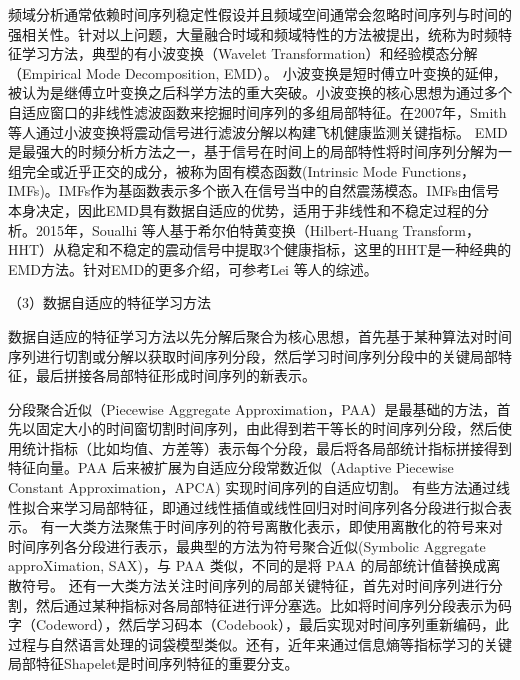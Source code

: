 频域分析通常依赖时间序列稳定性假设并且频域空间通常会忽略时间序列与时间的强相关性\cite{jardine2006review,lei2013review}。针对以上问题，大量融合时域和频域特性的方法被提出，统称为时频特征学习方法，典型的有小波变换（Wavelet Transformation）\cite{smith2007approach}和经验模态分解（Empirical Mode Decomposition, EMD）\cite{lei2013review}。
小波变换是短时傅立叶变换的延伸，被认为是继傅立叶变换之后科学方法的重大突破。小波变换的核心思想为通过多个自适应窗口的非线性滤波函数来挖掘时间序列的多组局部特征。在2007年，Smith 等人通过小波变换将震动信号进行滤波分解以构建飞机健康监测关键指标\cite{smith2007approach}。
EMD是最强大的时频分析方法之一，基于信号在时间上的局部特性将时间序列分解为一组完全或近乎正交的成分，被称为固有模态函数(Intrinsic Mode Functions，IMFs)。IMFs作为基函数表示多个嵌入在信号当中的自然震荡模态。IMFs由信号本身决定，因此EMD具有数据自适应的优势，适用于非线性和不稳定过程的分析。2015年，Soualhi 等人基于希尔伯特黄变换（Hilbert-Huang Transform，HHT）从稳定和不稳定的震动信号中提取3个健康指标\cite{soualhi2015bearing}，这里的HHT是一种经典的EMD方法。针对EMD的更多介绍，可参考Lei 等人的综述\cite{lei2013review}。

（3）数据自适应的特征学习方法


数据自适应的特征学习方法以先分解后聚合为核心思想，首先基于某种算法对时间序列进行切割或分解以获取时间序列分段，然后学习时间序列分段中的关键局部特征，最后拼接各局部特征形成时间序列的新表示。

分段聚合近似（Piecewise Aggregate Approximation，PAA）是最基础的方法\cite{keogh2000scaling}，首先以固定大小的时间窗切割时间序列，由此得到若干等长的时间序列分段，然后使用统计指标（比如均值、方差等）表示每个分段，最后将各局部统计指标拼接得到特征向量。PAA 后来被扩展为自适应分段常数近似（Adaptive Piecewise Constant Approximation，APCA) 实现时间序列的自适应切割\cite{keogh2001locally}。
有些方法通过线性拟合来学习局部特征，即通过线性插值或线性回归对时间序列各分段进行拟合表示。 
有一大类方法聚焦于时间序列的符号离散化表示，即使用离散化的符号来对时间序列各分段进行表示，最典型的方法为符号聚合近似(Symbolic Aggregate approXimation, SAX)\cite{lin2003symbolic}，与 PAA 类似，不同的是将 PAA 的局部统计值替换成离散符号。
还有一大类方法关注时间序列的局部关键特征，首先对时间序列进行分割，然后通过某种指标对各局部特征进行评分塞选。比如将时间序列分段表示为码字（Codeword），然后学习码本（Codebook），最后实现对时间序列重新编码\cite{fu2011review}，此过程与自然语言处理的词袋模型类似。还有，近年来通过信息熵等指标学习的关键局部特征Shapelet是时间序列特征的重要分支\cite{ye2009time}。

